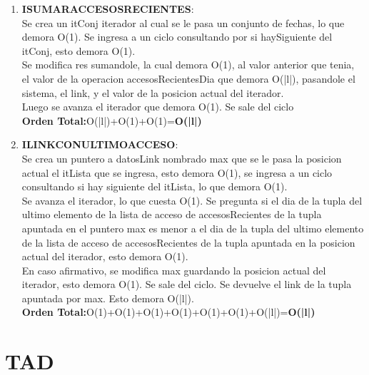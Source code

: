\documentclass[10pt, a4paper]{article}
\begin{document}
\begin{enumerate}
     \item \textbf{ISUMARACCESOSRECIENTES}:\\ Se crea un itConj iterador al cual se le pasa un conjunto de fechas, lo que demora O(1). Se ingresa a un ciclo consultando por si haySiguiente del itConj, esto demora O(1).\\
Se modifica res sumandole, la cual demora O(1), al valor anterior que tenia, el valor de la operacion accesosRecientesDia que demora O(|l|), pasandole el sistema, el link, y el valor de la posicion actual del iterador.\\ 
Luego se avanza el iterador que demora O(1). Se sale del ciclo \\
\textbf{Orden Total:}O(|l|)+O(1)+O(1)=\textbf{O(|l|)}

     \item \textbf{ILINKCONULTIMOACCESO}:\\ Se crea un puntero a datosLink nombrado max que se le pasa la posicion actual el itLista que se ingresa, esto demora O(1), se ingresa a un ciclo consultando si hay siguiente del itLista, lo que demora O(1). \\
Se avanza el iterador, lo que cuesta O(1). Se pregunta si el dia de la tupla del ultimo elemento de la lista de acceso de accesosRecientes de la tupla apuntada en el puntero max es menor a el dia de la tupla del ultimo elemento de la lista de acceso de accesosRecientes de la tupla apuntada en la posicion actual del iterador, esto demora O(1). \\
En caso afirmativo, se modifica max guardando la posicion actual del iterador, esto demora O(1). Se sale del ciclo. Se devuelve el link de la tupla apuntada por max. Esto demora O(|l|). \\
\textbf{Orden Total:}O(1)+O(1)+O(1)+O(1)+O(1)+O(1)+O(|l|)=\textbf{O(|l|)}
      

    \end{enumerate}




\section{TAD }
\end{document}
